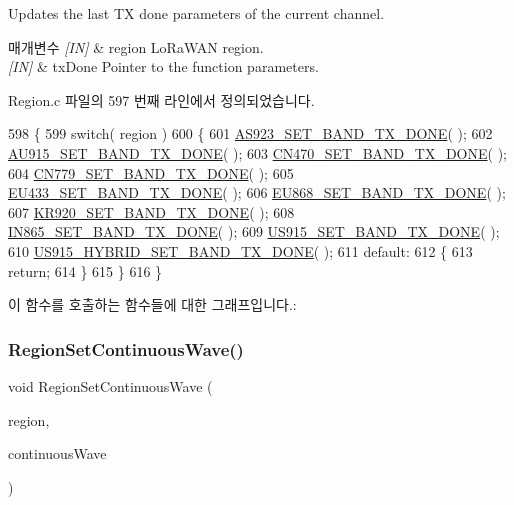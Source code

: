 Updates the last TX done parameters of the current channel. 


\begin{DoxyParams}{매개변수}
{\em \mbox{[}\+I\+N\mbox{]}} & region Lo\+Ra\+W\+AN region.\\
\hline
{\em \mbox{[}\+I\+N\mbox{]}} & tx\+Done Pointer to the function parameters. \\
\hline
\end{DoxyParams}


Region.\+c 파일의 597 번째 라인에서 정의되었습니다.


\begin{DoxyCode}
598 \{
599     \textcolor{keywordflow}{switch}( region )
600     \{
601         \mbox{\hyperlink{_region_8c_aa2f1c00c2d2ad8292046ed5ed9923046}{AS923\_SET\_BAND\_TX\_DONE}}( );
602         \mbox{\hyperlink{_region_8c_ae1f2fcce477ca77f9f38fcb50385889d}{AU915\_SET\_BAND\_TX\_DONE}}( );
603         \mbox{\hyperlink{_region_8c_ac9f44855ac37a8f9ea7fc80cc9bdbfb2}{CN470\_SET\_BAND\_TX\_DONE}}( );
604         \mbox{\hyperlink{_region_8c_ab8b47c2099f6c091399ad29bd81016af}{CN779\_SET\_BAND\_TX\_DONE}}( );
605         \mbox{\hyperlink{_region_8c_a698f3633e9fbd010f663aeb6a74b6766}{EU433\_SET\_BAND\_TX\_DONE}}( );
606         \mbox{\hyperlink{_region_8c_a35e93bed3f1d14efdb87b32e86d251dd}{EU868\_SET\_BAND\_TX\_DONE}}( );
607         \mbox{\hyperlink{_region_8c_a54d8766cece3796a3ad5ce10132b2215}{KR920\_SET\_BAND\_TX\_DONE}}( );
608         \mbox{\hyperlink{_region_8c_aa57edf1e7a44ac7b32155c54a35d554c}{IN865\_SET\_BAND\_TX\_DONE}}( );
609         \mbox{\hyperlink{_region_8c_a929a61a1b7fd603734c1289c781c1899}{US915\_SET\_BAND\_TX\_DONE}}( );
610         \mbox{\hyperlink{_region_8c_a6f274a761064e9f4d439b0230fb3cbfc}{US915\_HYBRID\_SET\_BAND\_TX\_DONE}}( );
611         \textcolor{keywordflow}{default}:
612         \{
613             \textcolor{keywordflow}{return};
614         \}
615     \}
616 \}
\end{DoxyCode}
이 함수를 호출하는 함수들에 대한 그래프입니다.\+:
\mbox{\label{group___r_e_g_i_o_n_ga22327f217ed10d84c89b6785143be5b8}} 
\subsubsection{\texorpdfstring{Region\+Set\+Continuous\+Wave()}{RegionSetContinuousWave()}}
{\footnotesize\ttfamily void Region\+Set\+Continuous\+Wave (\begin{DoxyParamCaption}\item[{\mbox{\hyperlink{group___l_o_r_a_m_a_c_ga80c48efda9ae02e14b58160d34a798dd}{Lo\+Ra\+Mac\+Region\+\_\+t}}}]{region,  }\item[{\mbox{\hyperlink{group___r_e_g_i_o_n_gaf39bb5ba06921139c6d17f88a8d518cd}{Continuous\+Wave\+Params\+\_\+t}} $\ast$}]{continuous\+Wave }\end{DoxyParamCaption})}




